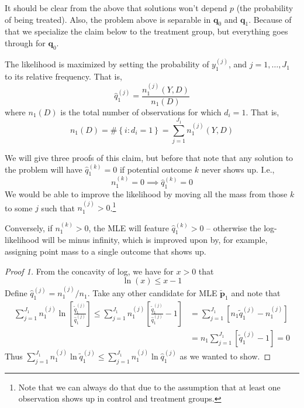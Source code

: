\documentclass[11pt]{article} %
\begin{document}
It should be clear from the above that solutions won't depend $p$ (the
probability of being treated). Also, the problem above is separable in $\mathbf
q_0$ and $\mathbf q_1$. Because of that we specialize the claim below to the
treatment group, but everything goes through for $\mathbf q_0$.

\begin{claim}\label{cl:mle} The likelihood is maximized by setting the probability of
  $y_1^{(j)}$, and $j=1,\ldots, J_1$ to its relative frequency. That is,
  \[ \hat q_1^{(j)} = \frac{n_1^{(j)}(Y,D)}{n_1(D)}\]
  where $n_1(D)$ is the total number of observations for which $d_i=1$. That is,
  \[ n_1(D) = \# \left\{ i : d_i = 1 \right\} = \sum_{j=1}^{J_1} n_1^{(j)}(Y,D)\]
\end{claim}

We will give three proofs of this claim, but before that note that any solution to the problem will have $\hat
q_1^{(k)} = 0$ if potential outcome $k$ never shows up. I.e.,
\[ n_1^{(k)} = 0 \implies \hat q_1^{(k)} = 0 \]
We would be able to improve the likelihood
by moving all the mass from those $k$ to some $j$ such that $n_1^{(j)}>
0$.\footnote{Note that we can always do that due to the assumption that at least
one observation shows up in control and treatment groups.}

Conversely, if $n_1^{(k)}> 0$, the MLE will feature $\hat q_1^{(k)} > 0$ -- otherwise the
log-likelihood will be minus infinity, which is improved upon by, for example, assigning
point mass to a single outcome that shows up. 

\begin{proof}[Proof 1]
  From the concavity of log, we have for $x > 0$ that
  \begin{equation}
    \label{eq:concavelog}
    \ln(x) \leq x - 1
  \end{equation}
  Define $\hat q_1^{(j)} = n_1^{(j)}/n_1$. Take any other candidate for MLE
  $\tilde {\mathbf p}_1$ and note that
  \[
    \begin{aligned}
      \sum_{j=1}^{J_1} n_1^{(j)} \ln \left[ \frac{\tilde q_1^{(j)}}{\hat
          q_1^{(j)}} \right] \leq \sum_{j=1}^{J_1} n_1^{(j)} \left[ \frac{\tilde
          q_1^{(j)}}{\hat q_1^{(j)}} - 1 \right] & = \sum_{j=1}^{J_1} \left[ n_1
        \tilde q_1^{(j)} - n_1^{(j)} \right] \\
      & = n_1 \sum_{j=1}^{J_1} \left[  \tilde q_1^{(j)} - 1 \right] = 0
    \end{aligned}
  \]
  Thus $\sum_{j=1}^{J_1} n_1^{(j)} \ln \tilde q_1^{(j)} \leq
  \sum_{j=1}^{J_1} n_1^{(j)} \ln \hat q_1^{(j)}$ as we wanted to show.
  
 
\end{proof}
\end{document}
